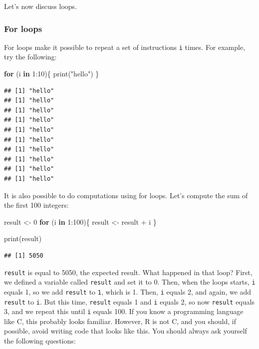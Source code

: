 \documentclass[
]{article}
\newenvironment{Shaded}{\begin{snugshade}}{\end{snugshade}}
\newcommand{\ControlFlowTok}[1]{\textcolor[rgb]{0.13,0.29,0.53}{\textbf{#1}}}
\newcommand{\DecValTok}[1]{\textcolor[rgb]{0.00,0.00,0.81}{#1}}
\newcommand{\FunctionTok}[1]{\textcolor[rgb]{0.00,0.00,0.00}{#1}}
\newcommand{\NormalTok}[1]{#1}
\newcommand{\OtherTok}[1]{\textcolor[rgb]{0.56,0.35,0.01}{#1}}
\newcommand{\SpecialCharTok}[1]{\textcolor[rgb]{0.00,0.00,0.00}{#1}}
\newcommand{\StringTok}[1]{\textcolor[rgb]{0.31,0.60,0.02}{#1}}
\begin{document}
Let's now discuss loops.

\hypertarget{for-loops}{%
\subsubsection{For loops}\label{for-loops}}

For loops make it possible to repeat a set of instructions \texttt{i} times. For example, try the following:

\begin{Shaded}
\begin{Highlighting}[]
\ControlFlowTok{for}\NormalTok{ (i }\ControlFlowTok{in} \DecValTok{1}\SpecialCharTok{:}\DecValTok{10}\NormalTok{)\{}
  \FunctionTok{print}\NormalTok{(}\StringTok{"hello"}\NormalTok{)}
\NormalTok{\}}
\end{Highlighting}
\end{Shaded}

\begin{verbatim}
## [1] "hello"
## [1] "hello"
## [1] "hello"
## [1] "hello"
## [1] "hello"
## [1] "hello"
## [1] "hello"
## [1] "hello"
## [1] "hello"
## [1] "hello"
\end{verbatim}

It is also possible to do computations using for loops. Let's compute the sum of the first
100 integers:

\begin{Shaded}
\begin{Highlighting}[]
\NormalTok{result }\OtherTok{\textless{}{-}} \DecValTok{0}
\ControlFlowTok{for}\NormalTok{ (i }\ControlFlowTok{in} \DecValTok{1}\SpecialCharTok{:}\DecValTok{100}\NormalTok{)\{}
\NormalTok{  result }\OtherTok{\textless{}{-}}\NormalTok{ result }\SpecialCharTok{+}\NormalTok{ i}
\NormalTok{\}}

\FunctionTok{print}\NormalTok{(result)}
\end{Highlighting}
\end{Shaded}

\begin{verbatim}
## [1] 5050
\end{verbatim}

\texttt{result} is equal to 5050, the expected result. What happened in that loop? First, we defined a
variable called \texttt{result} and set it to 0. Then, when the loops starts, \texttt{i} equals 1, so we add
\texttt{result} to \texttt{1}, which is 1. Then, \texttt{i} equals 2, and again, we add \texttt{result} to \texttt{i}. But this time,
\texttt{result} equals 1 and \texttt{i} equals 2, so now \texttt{result} equals 3, and we repeat this until \texttt{i}
equals 100. If you know a programming language like C, this probably looks familiar. However, R is
not C, and you should, if possible, avoid writing code that looks like this. You should always
ask yourself the following questions:
\end{document}
